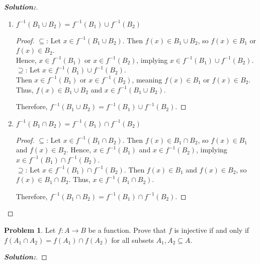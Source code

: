 \documentclass[12pt]{article}
\theoremstyle{definition}\newtheorem{problem}{Problem}
\newenvironment{solution}{\begin{proof}[\bfseries\textup{Solution:}]}{\end{proof}}
\begin{document}
\begin{solution}
\begin{enumerate}
\begin{proof}
            Therefore, \( f(A_1 \cap A_2) \subseteq f(A_1) \cap f(A_2) \).
        \end{proof}  
        \bigbreak
        \item \textbf{\( f^{-1}(B_1 \cup B_2) = f^{-1}(B_1) \cup f^{-1}(B_2) \)}
        
        \begin{proof}
            \(\subseteq\): Let \( x \in f^{-1}(B_1 \cup B_2) \). Then \( f(x) \in B_1 \cup B_2 \), so \( f(x) \in B_1 \) or \( f(x) \in B_2 \). \\
            Hence, \( x \in f^{-1}(B_1) \) or \( x \in f^{-1}(B_2) \), implying \( x \in f^{-1}(B_1) \cup f^{-1}(B_2) \).\\
            
            \(\supseteq\): Let \( x \in f^{-1}(B_1) \cup f^{-1}(B_2) \). \\
            Then \( x \in f^{-1}(B_1) \) or \( x \in f^{-1}(B_2) \), meaning \( f(x) \in B_1 \) or \( f(x) \in B_2 \). \\
            Thus, \( f(x) \in B_1 \cup B_2 \) and \( x \in f^{-1}(B_1 \cup B_2) \).
            
            Therefore, \( f^{-1}(B_1 \cup B_2) = f^{-1}(B_1) \cup f^{-1}(B_2) \).
        \end{proof}
        
        \bigbreak
        \item \textbf{\( f^{-1}(B_1 \cap B_2) = f^{-1}(B_1) \cap f^{-1}(B_2) \)}
        
        \begin{proof}
            \(\subseteq\): Let \( x \in f^{-1}(B_1 \cap B_2) \). Then \( f(x) \in B_1 \cap B_2 \), so \( f(x) \in B_1 \) and \( f(x) \in B_2 \). Hence, \( x \in f^{-1}(B_1) \) and \( x \in f^{-1}(B_2) \), implying \( x \in f^{-1}(B_1) \cap f^{-1}(B_2) \).\\
            
            \(\supseteq\): Let \( x \in f^{-1}(B_1) \cap f^{-1}(B_2) \). Then \( f(x) \in B_1 \) and \( f(x) \in B_2 \), so \( f(x) \in B_1 \cap B_2 \). Thus, \( x \in f^{-1}(B_1 \cap B_2) \).
            
            Therefore, \( f^{-1}(B_1 \cap B_2) = f^{-1}(B_1) \cap f^{-1}(B_2) \).
        \end{proof}
    \end{enumerate}
    
\end{solution}

\newpage
\begin{problem}
Let $f:A\to B$ be a function.  Prove that $f$ is injective if and only if $f(A_1\cap A_2) = f(A_1) \cap f(A_2)$ for all subsets $A_1,A_2\subseteq A$.
\end{problem}
\begin{solution}

    



\end{solution}
\end{document}
